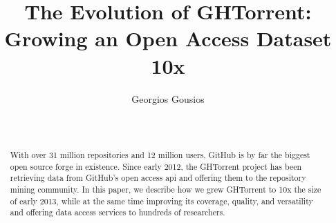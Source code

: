 \documentclass{sig-alternate}
\begin{document}






%

\title{The Evolution of GHTorrent: Growing an Open Access Dataset 10x}
%
\author{
%
\alignauthor Georgios Gousios\\
       \\
       \\
}

\maketitle
\begin{abstract}

With over 31 million repositories and 12 million users, GitHub is by far the
biggest open source forge in existence. Since early 2012, the GHTorrent project
has been retrieving data from GitHub's open access {\sc api} and offering them
to the repository mining community. In this paper, we describe how we grew
GHTorrent to 10x the size of early 2013, while at the same time improving its
coverage, quality, and versatility and offering data access services to hundreds
of researchers.

\end{abstract}
\end{document}
